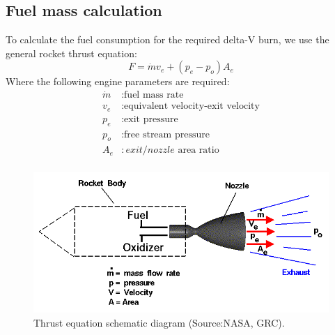 \subsection*{Fuel mass calculation}
To calculate the fuel consumption for the required delta-V burn, we use the general rocket thrust equation:
\begin{equation}
F = \dot{m}v_e+(p_e-p_o)A_e
\end{equation}
Where the following engine parameters are required:
\begin{equation}
\begin{split}
\dot{m}&:\text{fuel mass rate}\\
v_e&:\text{equivalent velocity-exit velocity}\\
p_e&:\text{exit pressure}\\
p_o&:\text{free stream pressure}\\
A_e&:exit/nozzle \text{ area ratio}\\
\end{split}
\end{equation}

\begin{figure}[htb]
\centering
\includegraphics[scale=0.6]{figures/Orbiter/rockth.png}
\caption{Thrust equation schematic diagram (Source:NASA, GRC).\cite{rocketeq}}
\label{fig:rocketim}
\end{figure}

